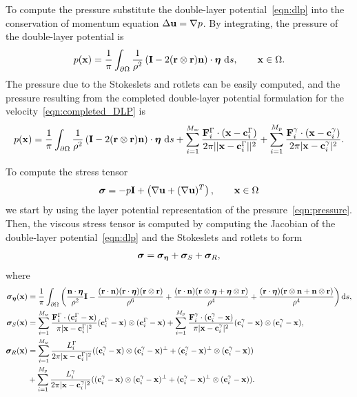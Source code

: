 \documentclass[preprint, 10pt]{elsarticle}
\begin{document}
To compute the pressure substitute the double-layer potential~\eqref{eqn:dlp}
into the conservation of momentum equation $\Delta{\mathbf{u}} = \nabla p$. By
integrating, the pressure of the double-layer potential is
\begin{align*}
  p({\mathbf{x}}) = \frac{1}{\pi}\int_{\partial\Omega}\frac{1}{\rho^2}\left(
\mathbf{I} - 2({\mathbf{r}} \otimes {\mathbf{r}}){\mathbf{n}}\right)\cdot{\boldsymbol\eta}~\text{d}s,
\qquad{\mathbf{x}}\in\Omega.
\end{align*}
The pressure due to the Stokeslets and rotlets can be easily computed,
and the pressure resulting from the completed double-layer potential
formulation for the velocity~\eqref{eqn:completed_DLP} is
\begin{align}
  \label{eqn:pressure} 
  p({\mathbf{x}}) = \frac{1}{\pi}\int_{\partial\Omega}\frac{1}{\rho^2}\left(
    \mathbf{I} - 2({\mathbf{r}} \otimes {\mathbf{r}}){\mathbf{n}}\right)\cdot{\boldsymbol\eta}~\text{d}s +
  \sum_{i=1}^{M_w}
  \frac{{\mathbf{F}}_i^\Gamma\cdot({\mathbf{x}}-{\mathbf{c}}_i^\Gamma)}{2\pi||{\mathbf{x}}-{\mathbf{c}}_i^{\Gamma}||^2}
  + \sum_{i=1}^{M_p}
    \frac{{\mathbf{F}}_i^\gamma\cdot({\mathbf{x}}-{\mathbf{c}}_i^\gamma)}{2\pi|{\mathbf{x}}-{\mathbf{c}}_i^\gamma|^2}.
\end{align}

To compute the stress tensor
\begin{align*} 
{\boldsymbol\sigma} = -p \mathbf{I} + \left(\nabla {\mathbf{u}} + (\nabla{\mathbf{u}})^T\right), \qquad
{\mathbf{x}}\in\Omega
\end{align*}
we start by using the layer potential representation of the
pressure~\eqref{eqn:pressure}.  Then, the viscous stress tensor is
computed by computing the Jacobian of the double-layer
potential~\eqref{eqn:dlp} and the Stokeslets and rotlets to form
\begin{align}
  \label{eqn:stress}
  {\boldsymbol\sigma} = {\boldsymbol\sigma}_{{\boldsymbol\eta}} + {\boldsymbol\sigma}_{S} + {\boldsymbol\sigma}_{R},
\end{align}
where
\begin{align*}
  {\boldsymbol\sigma}_{{\boldsymbol\eta}}({\mathbf{x}}) &= \frac{1}{\pi}\int_{\partial\Omega}\left( 
    \frac{{\mathbf{n}}\cdot{\boldsymbol\eta}}{\rho^2}\mathbf{I} 
    -\frac{({\mathbf{r}}\cdot{\mathbf{n}})({\mathbf{r}}\cdot{\boldsymbol\eta})({\mathbf{r}}\otimes{\mathbf{r}})}{\rho^6} 
    +\frac{({\mathbf{r}}\cdot{\mathbf{n}})({\mathbf{r}}\otimes{\boldsymbol\eta} + {\boldsymbol\eta}\otimes{\mathbf{r}})}{\rho^4} 
+ \frac{({\mathbf{r}}\cdot{\boldsymbol\eta})({\mathbf{r}}\otimes{\mathbf{n}} +
{\mathbf{n}}\otimes{\mathbf{r}})}{\rho^4}\right)\text{d}s,\\
  {\boldsymbol\sigma}_S({\mathbf{x}}) &= \sum_{i=1}^{M_w} 
    \frac{{\mathbf{F}}_i^\Gamma\cdot({\mathbf{c}}_i^\Gamma-{\mathbf{x}})}{\pi|{\mathbf{x}}-{\mathbf{c}}_i^\Gamma|^2}
        ({\mathbf{c}}_i^\Gamma - {\mathbf{x}})\otimes({\mathbf{c}}_i^\Gamma-{\mathbf{x}})  + 
    \sum_{i=1}^{M_p}
    \frac{{\mathbf{F}}_i^\gamma\cdot({\mathbf{c}}_i^\gamma-{\mathbf{x}})}{\pi|{\mathbf{x}}-{\mathbf{c}}_i^\gamma|^2}
        ({\mathbf{c}}_i^\gamma - {\mathbf{x}})\otimes({\mathbf{c}}_i^\gamma-{\mathbf{x}}),\\
{\boldsymbol\sigma}_R({\mathbf{x}}) &= \sum_{i=1}^{M_w} \frac{L_i^\Gamma}{2\pi|{\mathbf{x}}-{\mathbf{c}}_i^\Gamma|^2}
(({\mathbf{c}}_i^\gamma - {\mathbf{x}})\otimes({\mathbf{c}}_i^\gamma-{\mathbf{x}})^\perp +
    ({\mathbf{c}}_i^\gamma - {\mathbf{x}})^\perp\otimes({\mathbf{c}}_i^\gamma-{\mathbf{x}}))  \\
&+ \sum_{i=1}^{M_p}
\frac{L_i^\gamma}{2\pi|{\mathbf{x}}-{\mathbf{c}}_i^\gamma|^2}
    (({\mathbf{c}}_i^\gamma - {\mathbf{x}})\otimes({\mathbf{c}}_i^\gamma-{\mathbf{x}})^\perp + 
    ({\mathbf{c}}_i^\gamma - {\mathbf{x}})^\perp\otimes({\mathbf{c}}_i^\gamma-{\mathbf{x}})).
\end{align*}
\end{document}
